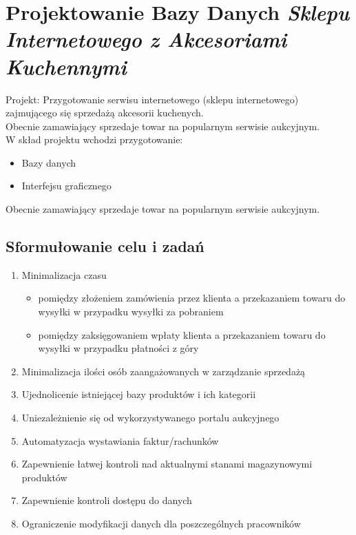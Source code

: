 \chapter{Projektowanie Bazy Danych \textit{Sklepu Internetowego z Akcesoriami Kuchennymi}}
Projekt: Przygotowanie serwisu internetowego (sklepu internetowego) zajmującego się sprzedażą akcesorii kuchenych.\\
Obecnie zamawiający sprzedaje towar na popularnym serwisie aukcyjnym.\\ 
W skład projektu wchodzi przygotowanie:
\begin{itemize}
\item Bazy danych
\item Interfejsu graficznego
\end{itemize}
Obecnie zamawiający sprzedaje towar na popularnym serwisie aukcyjnym.\\ 
\section{Sformułowanie celu i zadań}
\begin{enumerate}
\item Minimalizacja czasu
\begin{itemize}
\item pomiędzy złożeniem zamówienia przez klienta a przekazaniem towaru do wysyłki w przypadku wysyłki za pobraniem
\item pomiędzy zaksięgowaniem wpłaty klienta a przekazaniem towaru do wysyłki w przypadku płatności z góry 
\end{itemize} 
\item Minimalizacja ilości osób zaangażowanych w zarządzanie sprzedażą
\item Ujednolicenie istniejącej bazy produktów i ich kategorii
\item Uniezależnienie się od wykorzystywanego portalu aukcyjnego
\item Automatyzacja wystawiania faktur/rachunków
\item Zapewnienie łatwej kontroli nad aktualnymi stanami magazynowymi produktów
\item Zapewnienie kontroli dostępu do danych
\item Ograniczenie modyfikacji danych dla poszczególnych pracowników 
\end{enumerate}

